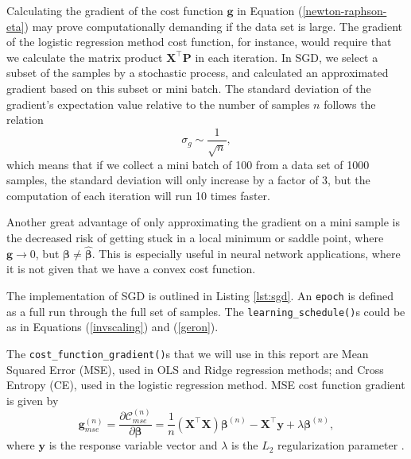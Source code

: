 \documentclass[]{article}
\begin{document}
\vspace{5mm}

Calculating the gradient of the cost function $\mathbf{g}$ in Equation (\ref{newton-raphson-eta}) may prove computationally demanding if the data set is large. The gradient of the logistic regression method cost function, for instance, would require that we calculate the matrix product $\mathbf{X}^\intercal \mathbf{P}$ in each iteration. In SGD, we select a subset of the samples by a stochastic process, and calculated an approximated gradient based on this subset or mini batch. The standard deviation of the gradient's expectation value relative to the number of samples $n$ follows the relation \cite{fys-stk4155-notes}
\begin{equation}
	\sigma_g \sim \frac{1}{\sqrt{n}},
\end{equation}
which means that if we collect a mini batch of 100 from a data set of 1000 samples, the standard deviation will only increase by a factor of 3, but the computation of each iteration will run 10 times faster.

Another great advantage of only approximating the gradient on a mini sample is the decreased risk of getting stuck in a local minimum or saddle point, where $\mathbf{g} \rightarrow 0$, but $\mathbf{\beta} \neq \mathbf{\hat{\beta}}$. This is especially useful in neural network applications, where it is not given that we have a convex cost function.

The implementation of SGD is outlined in Listing \ref{lst:sgd}. An \lstinline|epoch| is defined as a full run through the full set of samples. The \lstinline|learning_schedule()|s could be as in Equations (\ref{invscaling}) and (\ref{geron}). 

\vspace{5mm}

The \lstinline|cost_function_gradient()|s that we will use in this report are Mean Squared Error (MSE), used in OLS and Ridge regression methods; and Cross Entropy (CE), used in the logistic regression method. MSE cost function gradient is given by
\begin{equation} \label{cost-mse}
	\mathbf{g}_{mse}^{(n)} = \frac{\partial \mathcal{C}_{mse}^{(n)}}{\partial \mathbf{\beta}} = \frac{1}{n} (\mathbf{X}^\intercal \mathbf{X}) \mathbf{\beta}^{(n)} - \mathbf{X}^\intercal \mathbf{y} + \lambda \mathbf{\beta}^{(n)},
\end{equation}
where $\mathbf{y}$ is the response variable vector and $\lambda$ is the $L_2$ regularization parameter \cite{project1}. 
\end{document}
